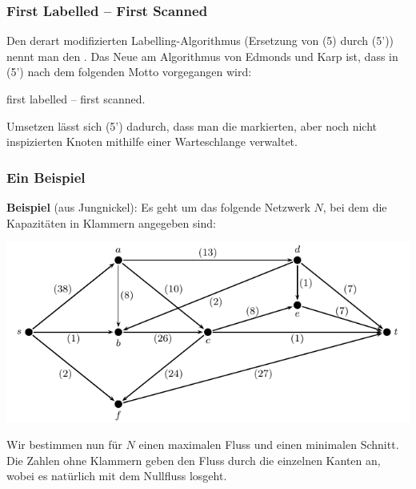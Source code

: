 \documentclass[smaller]{beamer}
\begin{document}
\begin{frame}
 \frametitle{First Labelled -- First Scanned}
 Den derart modifizierten Labelling-Algorithmus ({\glqq}Ersetzung von (5) durch (5'){\grqq}) nennt man den . Das Neue am Algorithmus von Edmonds und Karp ist, dass in (5') nach dem folgenden Motto vorgegangen wird: \\ \vspace*{0.2cm}

\begin{center}
\alert{first labelled -- first scanned.}
\end{center}
\vspace*{0.2cm}
Umsetzen lässt sich (5') dadurch, dass man die markierten, aber noch nicht inspizierten Knoten mithilfe einer \alert{Warteschlange} verwaltet. \\ \vspace*{0.2cm}

\end{frame}

\begin{frame}
 \frametitle{Ein Beispiel}

\textbf{Beispiel} (aus Jungnickel): Es geht um das folgende Netzwerk $N$, bei dem die Kapazitäten in Klammern angegeben sind:
 \begin{center}
 \includegraphics{fig22.pdf}
\end{center}
Wir bestimmen nun für $N$ einen maximalen Fluss und einen minimalen Schnitt. Die Zahlen ohne Klammern geben den Fluss durch die einzelnen Kanten an, wobei es natürlich mit dem Nullfluss losgeht.
\end{frame}
\end{document}
